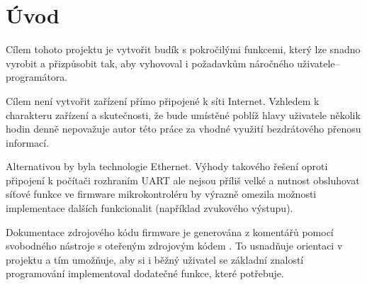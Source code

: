\section{Úvod}
Cílem tohoto projektu je vytvořit budík s pokročilými funkcemi, který lze
snadno vyrobit a přizpůsobit tak, aby vyhovoval i požadavkům náročného
uživatele--programátora. %

Cílem není vytvořit zařízení přímo připojené k síti Internet. Vzhledem k
charakteru zařízení a skutečnosti, že bude umístěné poblíž hlavy uživatele
několik hodin denně nepovažuje autor této práce za vhodné využití bezdrátového
přenosu informací.

Alternativou by byla technologie Ethernet. Výhody takového řešení oproti
připojení k počítači rozhraním UART ale nejsou příliš velké a nutnost
obsluhovat síťové funkce ve firmware mikrokontroléru by výrazně omezila
možnosti implementace dalších funkcionalit (například zvukového výstupu).

Dokumentace zdrojového kódu firmware je generována z komentářů pomocí
svobodného nástroje s oteřeným zdrojovým kódem . To usnadňuje
orientaci v projektu a tím umožňuje, aby si i běžný uživatel se základní
znalostí programování implementoval dodatečné funkce, které potřebuje.


